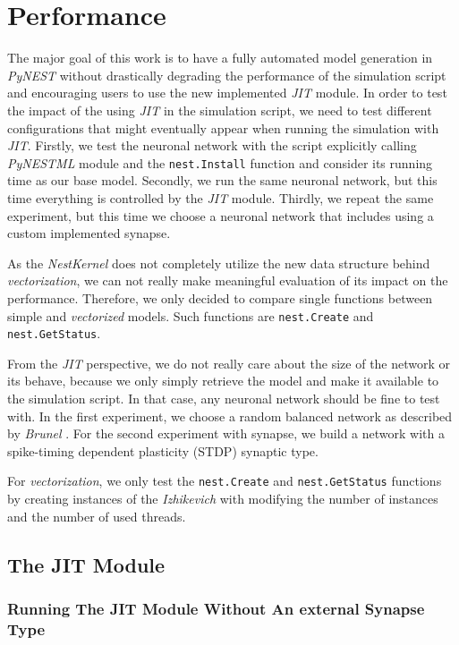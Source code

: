 \chapter{Performance}
 \label{chap:perf}
 
 The major goal of this work is to have a fully automated model generation in \emph{PyNEST} without drastically degrading the performance of the simulation script and encouraging users to use the new implemented \emph{JIT} module. In order to test the impact of the using \emph{JIT} in the simulation script, we need to test different configurations that might eventually appear when running the simulation with \emph{JIT}. Firstly, we test the neuronal network with the script explicitly calling \emph{PyNESTML} module and the \texttt{nest.Install} function and  consider its running time as our base model. Secondly, we run the same neuronal network, but this time everything is controlled by the \emph{JIT} module. Thirdly, we repeat the same experiment, but this time we choose a neuronal network that includes using a custom implemented synapse.
 
 As the \emph{NestKernel} does not completely utilize the new data structure behind \emph{vectorization}, we can not really make meaningful evaluation of its impact on the performance. Therefore, we only decided to compare single functions between simple and \emph{vectorized} models. Such functions are \texttt{nest.Create} and \texttt{nest.GetStatus}.
 
 From the \emph{JIT} perspective, we do not really care about the size of the network or its behave, because we only simply retrieve the model and make it available to the simulation script. In that case, any neuronal network should be fine to test with. In the first experiment, we choose a random balanced network as  described by \emph{Brunel} \citep{brunel2000dynamics}. For the second experiment with synapse, we build a network with a spike-timing dependent plasticity (STDP) synaptic type.
 
 
 For \emph{vectorization}, we only test the \texttt{nest.Create} and \texttt{nest.GetStatus} functions by creating instances of the \emph{Izhikevich} \citep{1257420} with modifying the number of instances and the number of used threads.
 
\section{The JIT Module}

\subsection*{Running The JIT Module Without An external Synapse Type}

